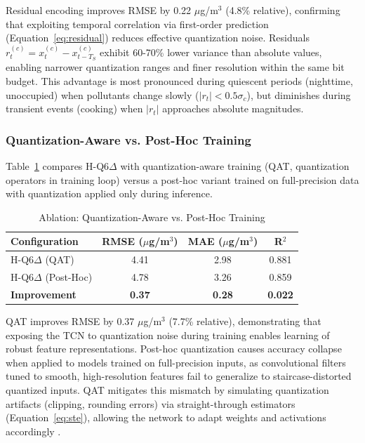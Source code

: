 Residual encoding improves RMSE by 0.22 $\mu$g/m$^3$ (4.8\% relative), confirming that exploiting temporal correlation via first-order prediction (Equation~\eqref{eq:residual}) reduces effective quantization noise. Residuals $r_t^{(c)} = x_t^{(c)} - x_{t-T_S}^{(c)}$ exhibit 60-70\% lower variance than absolute values, enabling narrower quantization ranges and finer resolution within the same bit budget. This advantage is most pronounced during quiescent periods (nighttime, unoccupied) when pollutants change slowly ($|r_t| < 0.5 \sigma_c$), but diminishes during transient events (cooking) when $|r_t|$ approaches absolute magnitudes.

\subsubsection{Quantization-Aware vs. Post-Hoc Training}

Table~\ref{tab:ablation_qat} compares H-Q6$\Delta$ with quantization-aware training (QAT, quantization operators in training loop) versus a post-hoc variant trained on full-precision data with quantization applied only during inference.

\begin{table}[h]
\centering
\caption{Ablation: Quantization-Aware vs. Post-Hoc Training}
\label{tab:ablation_qat}
\begin{tabular}{lccc}
\toprule
\textbf{Configuration} & \textbf{RMSE ($\mu$g/m$^3$)} & \textbf{MAE ($\mu$g/m$^3$)} & \textbf{R$^2$} \\
\midrule
H-Q6$\Delta$ (QAT) & 4.41 & 2.98 & 0.881 \\
H-Q6$\Delta$ (Post-Hoc) & 4.78 & 3.26 & 0.859 \\
\midrule
\textbf{Improvement} & \textbf{0.37} & \textbf{0.28} & \textbf{0.022} \\
\bottomrule
\end{tabular}
\end{table}

QAT improves RMSE by 0.37 $\mu$g/m$^3$ (7.7\% relative), demonstrating that exposing the TCN to quantization noise during training enables learning of robust feature representations. Post-hoc quantization causes accuracy collapse when applied to models trained on full-precision inputs, as convolutional filters tuned to smooth, high-resolution features fail to generalize to staircase-distorted quantized inputs. QAT mitigates this mismatch by simulating quantization artifacts (clipping, rounding errors) via straight-through estimators (Equation~\eqref{eq:ste}), allowing the network to adapt weights and activations accordingly \cite{jacob2018qat}.

